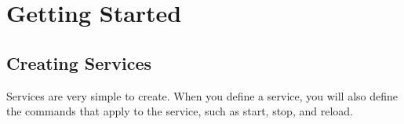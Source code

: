 \documentclass[letterpaper,10pt,english]{manual}
\begin{document}
\resetcurrentobjects
\hypertarget{--doc-gettingstarted/index}{}

\hypertarget{gettingstarted-index}{}\chapter{Getting Started}

\resetcurrentobjects
\hypertarget{--doc-gettingstarted/creating_services}{}

\hypertarget{gettingstarted-creating-services}{}\section{Creating Services}

Services are very simple to create. When you define a service, you will also define the commands that apply to the service, such as start, stop, and reload.
\end{document}

